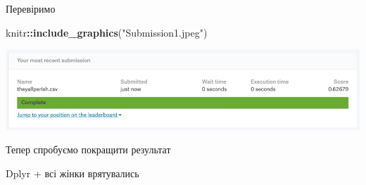 \documentclass[ignorenonframetext,]{beamer}
\newenvironment{Shaded}{\begin{snugshade}}{\end{snugshade}}
\newcommand{\ControlFlowTok}[1]{\textcolor[rgb]{0.13,0.29,0.53}{\textbf{#1}}}
\newcommand{\DataTypeTok}[1]{\textcolor[rgb]{0.13,0.29,0.53}{#1}}
\newcommand{\DecValTok}[1]{\textcolor[rgb]{0.00,0.00,0.81}{#1}}
\newcommand{\KeywordTok}[1]{\textcolor[rgb]{0.13,0.29,0.53}{\textbf{#1}}}
\newcommand{\NormalTok}[1]{#1}
\newcommand{\OperatorTok}[1]{\textcolor[rgb]{0.81,0.36,0.00}{\textbf{#1}}}
\newcommand{\StringTok}[1]{\textcolor[rgb]{0.31,0.60,0.02}{#1}}
\begin{document}
\begin{frame}[fragile]{Перевіримо}
\protect\hypertarget{ux43fux435ux440ux435ux432ux456ux440ux438ux43cux43e}{}

\begin{Shaded}
\begin{Highlighting}[]
\NormalTok{knitr}\OperatorTok{::}\KeywordTok{include_graphics}\NormalTok{(}\StringTok{"Submission1.jpeg"}\NormalTok{)}
\end{Highlighting}
\end{Shaded}

\includegraphics[width=13.38in]{Submission1}

\end{frame}

\begin{frame}[fragile]{Тепер спробуємо покращити результат}
\protect\hypertarget{ux442ux435ux43fux435ux440-ux441ux43fux440ux43eux431ux443ux454ux43cux43e-ux43fux43eux43aux440ux430ux449ux438ux442ux438-ux440ux435ux437ux443ux43bux44cux442ux430ux442}{}

Dplyr + всі жінки врятувались

\begin{Shaded}
\end{Shaded}

\end{frame}
\end{document}
